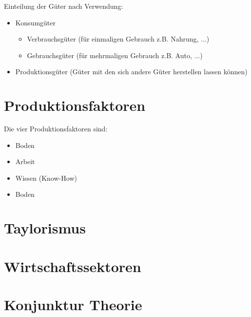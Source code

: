 \documentclass[a4paper]{report}
\begin{document}
Einteilung der Güter nach Verwendung:

\begin{itemize}
\item Konsumgüter
	\begin{itemize}
	\item Verbrauchsgüter (für einmaligen Gebrauch z.B. Nahrung, ...)
	\item Gebrauchsgüter (für mehrmaligen Gebrauch z.B. Auto, ...)
	\end{itemize}
\item Produktionsgüter (Güter mit den sich andere Güter herstellen lassen können)
\end{itemize}

\chapter{Produktionsfaktoren}

Die vier Produktionsfaktoren sind:

\begin{itemize}
\item Boden
\item Arbeit
\item Wissen (Know-How)
\item Boden
\end{itemize}


\chapter{Taylorismus}

\chapter{Wirtschaftssektoren}


\chapter{Konjunktur Theorie}
\end{document}
